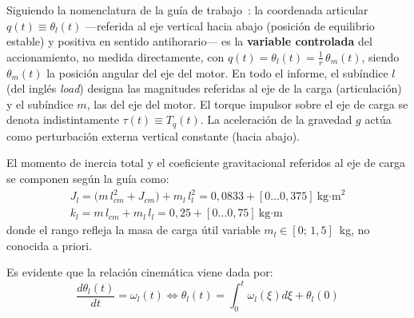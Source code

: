 \documentclass[12pt, a4paper,journal, onecolumn, compsoc]{IEEEtran}
\begin{document}
Siguiendo la nomenclatura de la guía de trabajo~\cite{guia_trabajo}: la coordenada articular $q(t) \equiv \theta_l(t)$ ---referida al eje vertical hacia abajo (posición de equilibrio estable) y positiva en sentido antihorario--- es la \textbf{variable controlada} del accionamiento, no medida directamente, con $q(t)=\theta_l(t)=\frac{1}{r}\,\theta_m(t)$, siendo $\theta_m(t)$ la posición angular del eje del motor. En todo el informe, el subíndice $l$ (del inglés \textit{load}) designa las magnitudes referidas al eje de la carga (articulación) y el subíndice $m$, las del eje del motor. El torque impulsor sobre el eje de carga se denota indistintamente $\tau(t) \equiv T_q(t)$. La aceleración de la gravedad $g$ actúa como perturbación externa vertical constante (hacia abajo).

El momento de inercia total y el coeficiente gravitacional referidos al eje de carga se componen según la guía como:
\begin{gather}
    J_l = \big(m\,l_{cm}^2 + J_{cm}\big) + m_l\,l_l^2 = 0{,}0833 + [0\ldots 0{,}375]\ \text{kg·m}^2 \\
    k_l = m\,l_{cm} + m_l\,l_l = 0{,}25 + [0\ldots 0{,}75]\ \text{kg·m}
\end{gather}
donde el rango refleja la masa de carga útil variable $m_l \in [0;\,1{,}5]$~kg, no conocida a priori.

Es evidente que la relación cinemática viene dada por:
\[
    \frac{d\theta_l(t)}{dt} = \omega_l(t) \Leftrightarrow \theta_l(t) = \int_0^t{\omega_l(\xi)d\xi + \theta_l(0)}
\]
\end{document}
